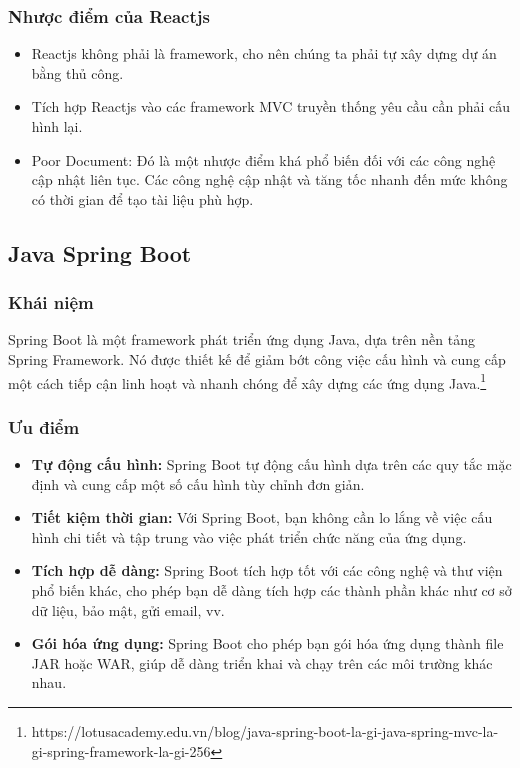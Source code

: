 \subsubsection{Nhược điểm của Reactjs}
\begin{itemize}
    \item Reactjs không phải là framework, cho nên chúng ta phải tự xây dựng dự án bằng thủ công.
    \item Tích hợp Reactjs vào các framework MVC truyền thống yêu cầu cần phải cấu hình lại.
    \item Poor Document: Đó là một nhược điểm khá phổ biến đối với các công nghệ cập nhật liên tục. Các công nghệ cập nhật và tăng tốc nhanh đến mức không có thời gian để tạo tài liệu phù hợp.
\end{itemize}
\subsection{Java Spring Boot}

\subsubsection{Khái niệm} Spring Boot là một framework phát triển ứng dụng Java, dựa trên nền tảng Spring Framework. Nó được thiết kế để giảm bớt công việc cấu hình và cung cấp một cách tiếp cận linh hoạt và nhanh chóng để xây dựng các ứng dụng Java.\footnote{https://lotusacademy.edu.vn/blog/java-spring-boot-la-gi-java-spring-mvc-la-gi-spring-framework-la-gi-256}

\subsubsection{Ưu điểm}
\begin{itemize}
    \item \textbf{Tự động cấu hình:} Spring Boot tự động cấu hình dựa trên các quy tắc mặc định và cung cấp một số cấu hình tùy chỉnh đơn giản.
    \item \textbf{Tiết kiệm thời gian:} Với Spring Boot, bạn không cần lo lắng về việc cấu hình chi tiết và tập trung vào việc phát triển chức năng của ứng dụng.
    \item \textbf{Tích hợp dễ dàng:} Spring Boot tích hợp tốt với các công nghệ và thư viện phổ biến khác, cho phép bạn dễ dàng tích hợp các thành phần khác như cơ sở dữ liệu, bảo mật, gửi email, vv.
    \item \textbf{Gói hóa ứng dụng:} Spring Boot cho phép bạn gói hóa ứng dụng thành file JAR hoặc WAR, giúp dễ dàng triển khai và chạy trên các môi trường khác nhau.
\end{itemize}


